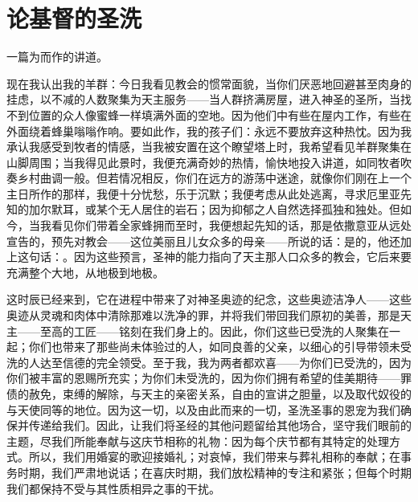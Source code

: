 
\chapter{论基督的圣洗}


一篇为而作的讲道。\par

现在我认出我的羊群：今日我看见教会的惯常面貌，当你们厌恶地回避甚至肉身的挂虑，以不减的人数聚集为天主服务——当人群挤满房屋，进入神圣的圣所，当找不到位置的众人像蜜蜂一样填满外面的空地。因为他们中有些在屋内工作，有些在外面绕着蜂巢嗡嗡作响。要如此作，我的孩子们：永远不要放弃这种热忱。因为我承认我感受到牧者的情感，当我被安置在这个瞭望塔上时，我希望看见羊群聚集在山脚周围；当我得见此景时，我便充满奇妙的热情，愉快地投入讲道，如同牧者吹奏乡村曲调一般。但若情况相反，你们在远方的游荡中迷途，就像你们刚在上一个主日所作的那样，我便十分忧愁，乐于沉默；我便考虑从此处逃离，寻求厄里亚先知的加尔默耳，或某个无人居住的岩石；因为抑郁之人自然选择孤独和独处。但如今，当我看见你们带着全家蜂拥而至时，我便想起先知的话，那是依撒意亚从远处宣告的，预先对教会——这位美丽且儿女众多的母亲——所说的话：是的，他还加上这句话：。因为这些预言，圣神的能力指向了天主那人口众多的教会，它后来要充满整个大地，从地极到地极。\par

这时辰已经来到，它在进程中带来了对神圣奥迹的纪念，这些奥迹洁净人——这些奥迹从灵魂和肉体中清除那难以洗净的罪，并将我们带回我们原初的美善，那是天主——至高的工匠——铭刻在我们身上的。因此，你们这些已受洗的人聚集在一起；你们也带来了那些尚未体验过的人，如同良善的父亲，以细心的引导带领未受洗的人达至信德的完全领受。至于我，我为两者都欢喜——为你们已受洗的，因为你们被丰富的恩赐所充实；为你们未受洗的，因为你们拥有希望的佳美期待——罪债的赦免，束缚的解除，与天主的亲密关系，自由的宣讲之胆量，以及取代奴役的与天使同等的地位。因为这一切，以及由此而来的一切，圣洗圣事的恩宠为我们确保并传递给我们。因此，让我们将圣经的其他问题留给其他场合，坚守我们眼前的主题，尽我们所能奉献与这庆节相称的礼物：因为每个庆节都有其特定的处理方式。所以，我们用婚宴的歌迎接婚礼；对哀悼，我们带来与葬礼相称的奉献；在事务时期，我们严肃地说话；在喜庆时期，我们放松精神的专注和紧张；但每个时期我们都保持不受与其性质相异之事的干扰。\par

